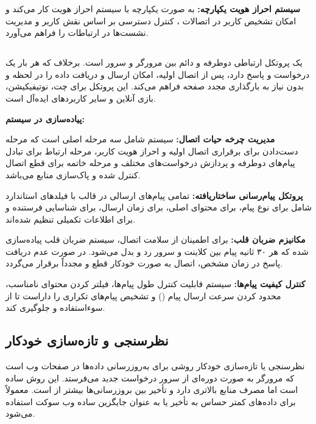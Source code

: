 \documentclass[12pt,a4paper]{report}
\begin{document}
	\textbf{سیستم احراز هویت یکپارچه:}  به صورت یکپارچه با سیستم احراز هویت  کار می‌کند و امکان تشخیص کاربر در اتصالات ، کنترل دسترسی بر اساس نقش کاربر و مدیریت نشست‌ها در ارتباطات  را فراهم می‌آورد.
	
	\subsection{}
	
	 یک پروتکل ارتباطی دوطرفه و دائم بین مرورگر و سرور است. برخلاف  که هر بار یک درخواست و پاسخ دارد،  پس از اتصال اولیه، امکان ارسال و دریافت داده را در لحظه و بدون نیاز به بارگذاری مجدد صفحه فراهم می‌کند. این پروتکل برای چت، نوتیفیکیشن، بازی آنلاین و سایر کاربردهای  ایده‌آل است.
	
	\textbf{پیاده‌سازی  در سیستم:}
	
	\textbf{مدیریت چرخه حیات اتصال:} سیستم  شامل سه مرحله اصلی است که مرحله دست‌دادن برای برقراری اتصال اولیه و احراز هویت کاربر، مرحله ارتباط برای تبادل پیام‌های دوطرفه و پردازش درخواست‌های مختلف و مرحله خاتمه برای قطع اتصال کنترل شده و پاک‌سازی منابع می‌باشد.
	
	\textbf{پروتکل پیام‌رسانی ساختاریافته:} تمامی پیام‌های ارسالی در قالب  با فیلدهای استاندارد شامل  برای نوع پیام،  برای محتوای اصلی،  برای زمان ارسال،  برای شناسایی فرستنده و  برای اطلاعات تکمیلی تنظیم شده‌اند.
	
	\textbf{مکانیزم ضربان قلب:} برای اطمینان از سلامت اتصال، سیستم ضربان قلب پیاده‌سازی شده که هر ۳۰ ثانیه پیام  بین کلاینت و سرور رد و بدل می‌شود. در صورت عدم دریافت پاسخ در زمان مشخص، اتصال به صورت خودکار قطع و مجدداً برقرار می‌گردد.
	
	\textbf{کنترل کیفیت پیام‌ها:} سیستم قابلیت کنترل طول پیام‌ها، فیلتر کردن محتوای نامناسب، محدود کردن سرعت ارسال پیام () و تشخیص پیام‌های تکراری را داراست تا از سوءاستفاده و  جلوگیری کند.
	
	\subsection{نظرسنجی و تازه‌سازی خودکار}
	
	نظرسنجی یا تازه‌سازی خودکار روشی برای به‌روزرسانی داده‌ها در صفحات وب است که مرورگر به صورت دوره‌ای از سرور درخواست جدید می‌فرستد. این روش ساده است اما مصرف منابع بالاتری دارد و تأخیر بین بروزرسانی‌ها بیشتر از  است. معمولاً برای داده‌های کمتر حساس به تأخیر یا به عنوان جایگزین ساده وب سوکت استفاده می‌شود.
	
\end{document}

